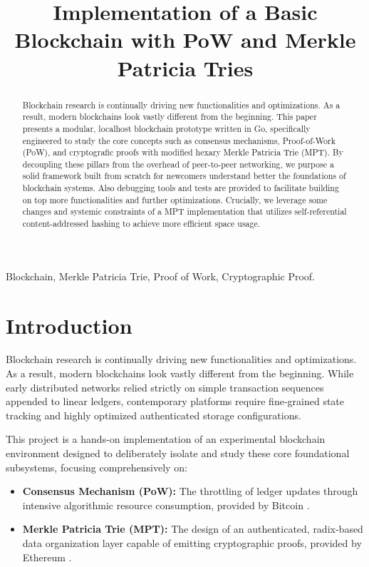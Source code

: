 \documentclass[10pt, conference]{IEEEtran}
\begin{document}
	
	\title{Implementation of a Basic Blockchain with PoW and Merkle Patricia Tries}
	
	\author{
	}
	
	\maketitle
	
	\begin{abstract}
	Blockchain research is continually driving new functionalities and optimizations. As a result, modern blockchains look vastly different from the beginning. This paper presents a modular, localhost blockchain prototype written in Go, specifically engineered to study the core concepts such as consensus mechanisms, Proof-of-Work (PoW), and cryptografic proofs with modified hexary Merkle Patricia Trie (MPT). By decoupling these pillars from the overhead of peer-to-peer networking, we purpose a solid framework built from scratch for newcomers understand better the foundations of blockchain systems. Also debugging tools and tests are provided to facilitate building on top more functionalities and further optimizations. Crucially, we leverage some changes and systemic constraints of a MPT implementation that utilizes self-referential content-addressed hashing to achieve more efficient space usage.
	\end{abstract}
	
	\begin{IEEEkeywords}
		Blockchain, Merkle Patricia Trie, Proof of Work, Cryptographic Proof.
	\end{IEEEkeywords}
	
	\section{Introduction}
	Blockchain research is continually driving new functionalities and optimizations. As a result, modern blockchains look vastly different from the beginning. While early distributed networks relied strictly on simple transaction sequences appended to linear ledgers, contemporary platforms require fine-grained state tracking and highly optimized authenticated storage configurations. 
	
	This project is a hands-on implementation of an experimental blockchain environment designed to deliberately isolate and study these core foundational subsystems, focusing comprehensively on:
	\begin{itemize}
		\item \textbf{Consensus Mechanism (PoW):} The throttling of ledger updates through intensive algorithmic resource consumption, provided by Bitcoin \cite{nakamoto2008bitcoin}.
		\item \textbf{Merkle Patricia Trie (MPT):} The design of an authenticated, radix-based data organization layer capable of emitting cryptographic proofs, provided by Ethereum \cite{wood2014ethereum}.
	\end{itemize}
	
\end{document}
